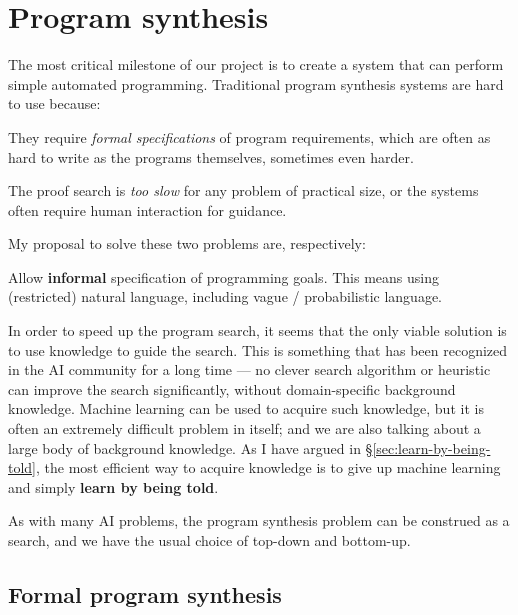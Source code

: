 \chapter{Program synthesis}
\minitoc

The most critical milestone of our project is to create a system that can perform simple automated programming.  Traditional program synthesis systems are hard to use because:\\
\begin{compactenum}[1.]
\item  They require \textit{formal specifications} of program requirements, which are often as hard to write as the programs themselves, sometimes even harder.

\item  The proof search is \textit{too slow} for any problem of practical size, or the systems often require human interaction for guidance.\\
\end{compactenum}

My proposal to solve these two problems are, respectively:\\
\begin{compactenum}[1.]
\item  Allow \textbf{informal} specification of programming goals.  This means using (restricted) natural language, including vague / probabilistic language.

\item  In order to speed up the program search, it seems that the only viable solution is to use knowledge to guide the search.  This is something that has been recognized in the AI community for a long time --- no clever search algorithm or heuristic can improve the search significantly, without domain-specific background knowledge.  Machine learning can be used to acquire such knowledge, but it is often an extremely difficult problem in itself; and we are also talking about a large body of background knowledge.  As I have argued in \S\ref{sec:learn-by-being-told}, the most efficient way to acquire knowledge is to give up machine learning and simply \textbf{learn by being told}.\\
\end{compactenum}

As with many AI problems, the program synthesis problem can be construed as a search, and we have the usual choice of top-down and bottom-up. %

\section{Formal program synthesis}

